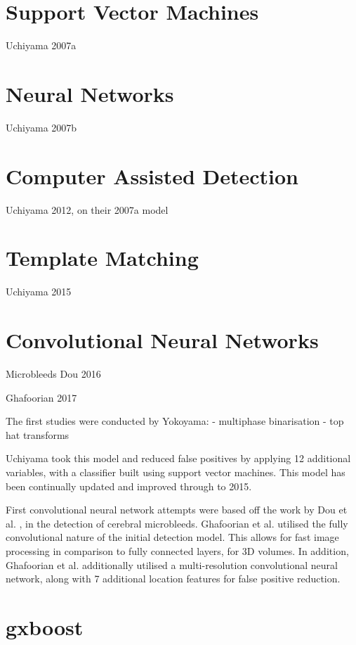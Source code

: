 \documentclass[honours,12pt]{unswthesis}
\numberwithin{equation}{section}
\begin{document}
\section{Support Vector Machines}

Uchiyama 2007a

\section{Neural Networks}

Uchiyama 2007b

\section{Computer Assisted Detection}

Uchiyama 2012, on their 2007a model

\section{Template Matching}

Uchiyama 2015

\section{Convolutional Neural Networks}

Microbleeds Dou 2016

Ghafoorian 2017

The first studies were conducted by Yokoyama:
 - multiphase binarisation
 - top hat transforms
 
 Uchiyama took this model and reduced false positives by applying 12 additional variables, with a classifier built using support vector machines. This model has been continually updated and improved through to 2015. 
 
First convolutional neural network attempts were based off the work by Dou et al. \cite{DouQ.2016ADoC}, in the detection of cerebral microbleeds. Ghafoorian et al. \cite{GhafoorianM.2017Dml3} utilised the fully convolutional nature of the initial detection model. This allows for fast image processing in comparison to fully connected layers, for 3D volumes. In addition, Ghafoorian et al. additionally utilised a multi-resolution convolutional neural network, along with 7 additional location features for false positive reduction.

\section{gxboost}
\end{document}
